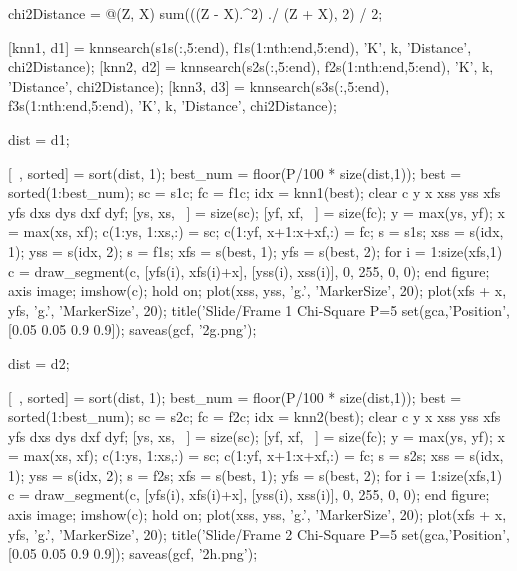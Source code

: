chi2Distance = @(Z, X) sum(((Z - X).^2) ./ (Z + X), 2) / 2;

[knn1, d1] = knnsearch(s1s(:,5:end), f1s(1:nth:end,5:end), 'K', k, 'Distance', chi2Distance);
[knn2, d2] = knnsearch(s2s(:,5:end), f2s(1:nth:end,5:end), 'K', k, 'Distance', chi2Distance);
[knn3, d3] = knnsearch(s3s(:,5:end), f3s(1:nth:end,5:end), 'K', k, 'Distance', chi2Distance);

dist = d1;

[~, sorted] = sort(dist, 1);
best_num = floor(P/100 * size(dist,1));
best = sorted(1:best_num);
sc = s1c;
fc = f1c;
idx = knn1(best);
clear c y x xss yss xfs yfs dxs dys dxf dyf;
[ys, xs, ~] = size(sc);
[yf, xf, ~] = size(fc);
y = max(ys, yf);
x = max(xs, xf);
c(1:ys, 1:xs,:) = sc;
c(1:yf, x+1:x+xf,:) = fc;
s = s1s;
xss = s(idx, 1);
yss = s(idx, 2);
s = f1s;
xfs = s(best, 1);
yfs = s(best, 2);
for i = 1:size(xfs,1)
    c = draw_segment(c, [yfs(i), xfs(i)+x], [yss(i), xss(i)], 0, 255, 0, 0);
end
figure;
axis image;
imshow(c);
hold on;
plot(xss, yss, 'g.', 'MarkerSize', 20);
plot(xfs + x, yfs, 'g.', 'MarkerSize', 20);
title('Slide/Frame 1 Chi-Square P=5%
set(gca,'Position', [0.05 0.05 0.9 0.9]);
saveas(gcf, '2g.png');

dist = d2;

[~, sorted] = sort(dist, 1);
best_num = floor(P/100 * size(dist,1));
best = sorted(1:best_num);
sc = s2c;
fc = f2c;
idx = knn2(best);
clear c y x xss yss xfs yfs dxs dys dxf dyf;
[ys, xs, ~] = size(sc);
[yf, xf, ~] = size(fc);
y = max(ys, yf);
x = max(xs, xf);
c(1:ys, 1:xs,:) = sc;
c(1:yf, x+1:x+xf,:) = fc;
s = s2s;
xss = s(idx, 1);
yss = s(idx, 2);
s = f2s;
xfs = s(best, 1);
yfs = s(best, 2);
for i = 1:size(xfs,1)
    c = draw_segment(c, [yfs(i), xfs(i)+x], [yss(i), xss(i)], 0, 255, 0, 0);
end
figure;
axis image;
imshow(c);
hold on;
plot(xss, yss, 'g.', 'MarkerSize', 20);
plot(xfs + x, yfs, 'g.', 'MarkerSize', 20);
title('Slide/Frame 2 Chi-Square P=5%
set(gca,'Position', [0.05 0.05 0.9 0.9]);
saveas(gcf, '2h.png');

